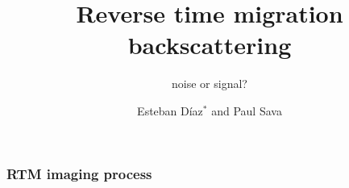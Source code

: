 

\Large
{}

\title[]{Reverse time migration backscattering}
\subtitle{noise or signal?}
\author[]{Esteban  D\'{i}az$^{*}$ and Paul Sava}
\date{}
\logo{}

\def\big#1{\begin{center} \LARGE \textbf{#1} \end{center}}
\def\cen#1{\begin{center}        \textbf{#1} \end{center}}

 { \cwpcover }



\begin{frame} \end{frame}






\begin{frame} \frametitle{RTM imaging process} \end{frame}

